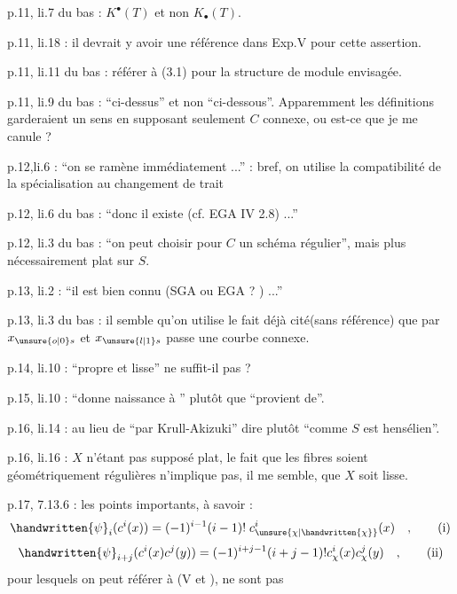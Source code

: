
p.11, li.7 du bas : $K^{\bullet}(T)$ et non $K_{\bullet}(T)$.

p.11, li.18 : il devrait y avoir une référence dans Exp.V pour cette assertion.

p.11, li.11 du bas : référer à (3.1) pour la structure de module envisagée.

p.11, li.9 du bas : ``ci-dessus'' et non ``ci-dessous''. Apparemment les définitions garderaient un sens en supposant seulement $C$ connexe, ou est-ce que je me canule ?

p.12,li.6 : ``on se ramène immédiatement ...'' : bref, on utilise la compatibilité de la spécialisation au changement de trait

p.12, li.6 du bas : ``donc il existe (cf. EGA IV 2.8) ...''

p.12, li.3 du bas : ``on peut choisir pour $C$ un schéma régulier'', mais plus nécessairement plat sur $S$.

p.13, li.2 : ``il est bien connu (SGA ou EGA ? ) ...''


p.13, li.3 du bas : il semble qu'on utilise le fait déjà cité(sans référence) que par $x_{\unsure{o|0}s}$ et $x_{\unsure{l|1}s}$ passe une courbe connexe.

p.14, li.10 : ``propre et lisse'' ne suffit-il pas ?

p.15, li.10 : ``donne naissance à '' plutôt que ``provient de''.

p.16, li.14 : au lieu de ``par Krull-Akizuki'' dire plutôt ``comme $S$ est hensélien''.

p.16, li.16 : $X$ n'étant pas supposé plat, le fait que les fibres soient géométriquement régulières n'implique pas, il me semble, que $X$ soit lisse.


p.17, 7.13.6 : les points importants, à savoir :
\begingroup
\makeatletter\tagsleft@true\makeatother
\[
\handwritten{\psi}_i(c^i(x)) = (-1)^{i-1}(i-1)!\;c^i_{\unsure{\chi|\handwritten{\chi}}}(x)\quad,\tag*{(i)}
\]
\[
\handwritten{\psi}_{i+j}(c^i(x)c^j(y)) = (-1)^{i+j-1}(i+j-1)!c^i_{\chi}(x)c^j_{\chi}(y)\quad,\tag*{(ii)}
\]
\endgroup
pour lesquels on peut référer à (V  et ), ne sont pas
